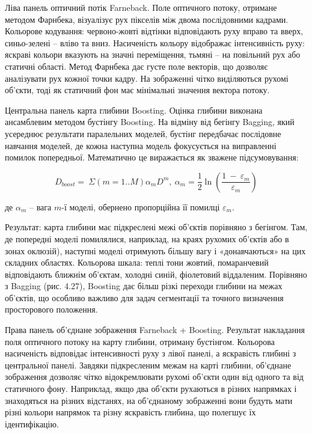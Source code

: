 \documentclass[
]{article}
\begin{document}
Ліва панель оптичний потік Farneback. Поле оптичного потоку, отримане методом Фарнбека, візуалізує рух пікселів між двома послідовними кадрами. Кольорове кодування: червоно-жовті відтінки відповідають руху вправо та вверх, синьо-зелені -- вліво та вниз. Насиченість кольору відображає інтенсивність руху: яскраві кольори вказують на значні переміщення, тьмяні -- на повільний рух або статичні області. Метод Фарнбека дає густе поле векторів, що дозволяє аналізувати рух кожної точки кадру. На зображенні чітко виділяються рухомі об'єкти, тоді як статичний фон має мінімальні значення вектора потоку.

Центральна панель карта глибини Boosting. Оцінка глибини виконана ансамблевим методом бустінгу Boosting. На відміну від бегінгу Bagging, який усереднює результати паралельних моделей, бустінг передбачає послідовне навчання моделей, де кожна наступна модель фокусується на виправленні помилок попередньої. Математично це виражається як зважене підсумовування:

\[D_{boost} = \ \Sigma(m = 1..M)\alpha_{m}D^{m},\ \alpha_{m} = \frac{1}{2}\ln\left( \frac{1\  - \ \varepsilon_{m}}{\varepsilon_{m}} \right)\]

де \(\alpha_{m}\) -- вага \(m\)-ї моделі, обернено пропорційна її помилці \(\varepsilon_{m}\).

Результат: карта глибини має підкреслені межі об'єктів порівняно з бегінгом. Там, де попередні моделі помилялися, наприклад, на краях рухомих об'єктів або в зонах оклюзій), наступні моделі отримують більшу вагу і «донавчаються» на цих складних областях. Кольорова шкала: теплі тони жовтий, помаранчевий відповідають ближнім об'єктам, холодні синій, фіолетовий віддаленим. Порівняно з Bagging (рис. 4.27), Boosting дає більш різкі переходи глибини на межах об'єктів, що особливо важливо для задач сегментації та точного визначення просторового положення.

Права панель об'єднане зображення Farneback + Boosting. Результат накладання поля оптичного потоку на карту глибини, отриману бустінгом. Кольорова насиченість відповідає інтенсивності руху з лівої панелі, а яскравість глибині з центральної панелі. Завдяки підкресленим межам на карті глибини, об'єднане зображення дозволяє чітко відокремлювати рухомі об'єкти один від одного та від статичного фону. Наприклад, якщо два об'єкти рухаються в різних напрямках і знаходяться на різних відстанях, на об'єднаному зображенні вони будуть мати різні кольори напрямок та різну яскравість глибина, що полегшує їх ідентифікацію.
\end{document}
